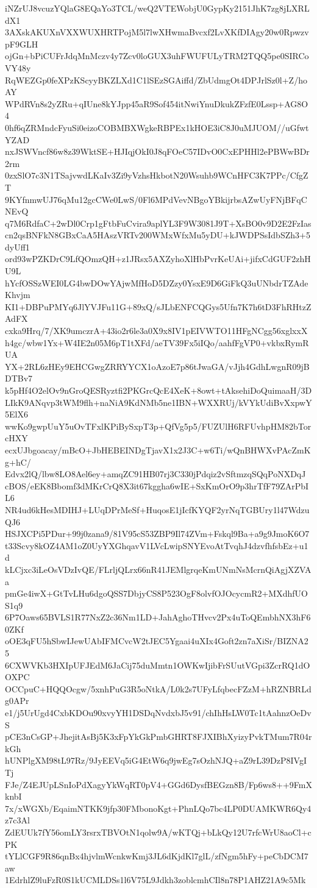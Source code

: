 iNZrUJ8vcuzYQlaG8EQaYo3TCL/weQ2VTEWobjU0GypKy2151JhK7zg8jLXRLdX1
3AXskAKUXnVXXWUXHRTPojM5l7lwXHwmaBvcxf2LvXKfDIAgy20w0RpwzvpF9GLH
ojGn+bPiCUFrJdqMnMczv4y7Zcv0loGUX3uhFWUFULyTRM2TQQ5pe0SIRCoVY48y
RqWEZGp0feXPzKScyyBKZLXd1C1lSEzSGAiffd/ZbUdmgOt4DPJrlSz0l+Z/hoAY
WPdRVn8s2yZRu+qIUne8kYJpp45aR9Sof454itNwiYnuDkukZFzfE0Lssp+AG8O4
0hf6qZRMndcFyuSi0eizoCOBMBXWgkeRBPEx1kHOE3iC8J0uMJUOM//uGfwtYZAD
nxJSWVncf86w8z39WktSE+HJIqjOkI0J8qFOeC57IDvO0CxEPHHl2ePBWwBDr2rm
0zxSlO7c3N1TSajvwdLKaIv3Zi9yVzhsHkbotN20Wsuhb9WCnHFC3K7PPc/CfgZT
9KYfnmwUJ76qMu12gcCWe0LwS/0Fl6MPdVevNBgoYBkijrbsAZwUyFNjBFqCNEvQ
q7M6RdfaC+2wDl0Crp1gFtbFuCvira9aplYL3F9W3081J9T+XsBO0v9D2E2FzIas
cn2qsBNFkN8GBxCaA5HAszVRTv200WMxWfxMu5yDU+kJWDPSsIdbSZh3+5dyUff1
ord93wPZKDrC9LfQOmzQH+z1JRsx5AXZyhoXlHbPvrKeUAi+jifxCdGUF2zhHU9L
hYcfOSSzWEI0LG4bwDOwYAjwMfHoD5DZzy0YsxE9D6GiFkQ3uUNbdrTZAdeKhvjm
KI1+DBPuPMYq6JlYVJFu11G+89xQ/sJLbENFCQGys5Ufn7K7h6tD3FhRHtzZAdFX
cxka9Hrq/7/XK9umczrA+43io2r6le3a0X9x8IV1pEIVWTO11HFgNCgg56xglxxX
h4gc/wbw1Yx+W4IE2n05M6pT1tXFd/aeTV39Fx5iIQo/aahfFgVP0+vkbxRymRUA
YX+2RL6zHEy9EHCGwgZRRYYCX1oAzoE7p86tJwaGA/vJjh4GdhLwgnR09jBDTBv7
k5pHf4O2elOv9nGroQESRyztfi2PKGrcQcE4XeK+8owt+tAksehiDoQuimaaH/3D
LIkK9ANqvp3tWM9flh+naNiA9KdNMb5ne1IBN+WXXRUj/kVYkUdiBvXxpwY5ElX6
wwKo9gwpUuY5uOvTFxlKPiBySxpT3p+QfVg5p5/FUZUlH6RFUvhpHM82bTorcHXY
ecxUJbgoacay/mBcO+JbHEBEINDgTjavX1x2J3C+w6Ti/wQnBHWXvPAcZmKg+hC/
Edvx2lQ/lbw8LO8Ael6ey+amqZC91HB07rj3C330jPdqiz2vSftmzqSQqPoNXDqJ
cBOS/eEK8Bbomf3dMKrCrQ8X3it67kggha6wIE+SxKmOrO9p3hrTfF79ZArPbIL6
NR4ud6kHesMDIHJ+LUqDPrMeSf+HuqosE1jIcfKYQF2yrNqTGBUry1l47WdzuQJ6
HSJXCPi5PDur+99j0zana9/81V95cS53ZBP9Il74ZVm+Fskql9Ba+a9g9JmoK6O7
t33Scvy8kOZ4AM1oZ0UyYXGhqavV1LVcLwipSNYEvoAtTvqhJ4dzvfhfsbEz+u1d
kLCjxc3iLeOsVDzIvQE/FLrljQLrx66nR41JEMlgrqeKmUNmNsMcrnQiAgjXZVAa
pmGe4iwX+GtTvLHu6dgoQSS7DbjyCS8P523OgF8olvfOJOcycmR2+MXdhfUOS1q9
6P7Oaws65BVLS1R77NxZ2c36Nm1LD+JahAghoTHvcv2Px4uToQEmbhNX3hF60ZKf
oOE3qFU5hSbwIJewUAbIFMCvcW2tJEC5Ygaai4uXIx4Goft2zn7aXiSr/BIZNA25
6CXWVKb3HXIpUFJEdM6JaCij75duMmtn1OWKwIjibFrSUutVGpi3ZcrRQ1dOOXPC
OCCpuC+HQQOcgw/5xnhPuG3R5oNtkA/L0k2s7UFyLfqbecFZzM+hRZNBRLdg0APr
e1/j5UrUgd4CxbKDOu90xvyYH1DSDqNvdxbJ5v91/chIhHsLW0Tc1tAahnzOeDvS
pCE3nCsGP+JhejitAsBj5K3xFpYkGkPmbGHRT8FJXIBhXyizyPvkTMum7R04rkGh
hUNPlgXM98tL97Rz/9JyEEVq5iG4EtW6q9jwEg7sOzhNJQ+aZ9rL39DzP8IVgITj
FJe/Z4EJUpLSnIoPdXagyYkWqRT0pV4+GGd6DysfBEGzn8B/Fp6ws8++9FmXknbI
7x/xWGXb/EqaimNTKK9jfp30FMbonoKgt+PhnLQo7bc4LP0DUAMKWR6Qy4z7c3Al
ZdEUUk7fY56omLY3rsrxTBVOtN1qolw9A/wKTQj+bLkQy12U7rfcWrU8aoCl+cPK
tYLlCGF9R86qnBx4hjvlmWcnkwKmj3JL6dKjdKl7glL/zfNgm5hFy+peCbDCM7aw
1EdrhlZ9luFzR0S1kUCMLDSs1l6V75L9Jdkh3zoblcmhCIl8n78P1AHZ21A9c5Mk
